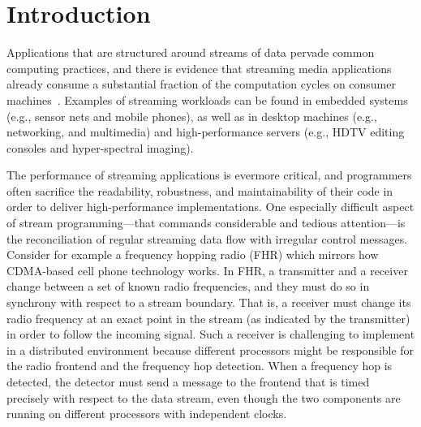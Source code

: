 \section{Introduction}


Applications that are structured around streams of data pervade common
computing  practices,  and  there  is evidence  that  streaming  media
applications already consume a substantial fraction of the computation
cycles    on    consumer   machines~\cite{Rix98}.
Examples  of streaming  workloads  can be  found  in embedded  systems
(e.g., sensor nets and mobile  phones), as well as in desktop machines
(e.g., networking, and  multimedia) and high-performance servers (e.g.,
HDTV editing consoles and hyper-spectral imaging). 

The performance of streaming applications is evermore critical, and
programmers often sacrifice the readability, robustness, and
maintainability of their code in order to deliver high-performance
implementations.  One especially difficult aspect of stream
programming---that commands considerable and tedious attention---is
the reconciliation of regular streaming data flow with irregular
control messages. Consider for example a frequency hopping radio (FHR)
which mirrors how CDMA-based cell phone technology works.  In FHR, a
transmitter and a receiver change between a set of known radio
frequencies, and they must do so in synchrony with respect to a stream
boundary. That is, a receiver must change its radio frequency at an
exact point in the stream (as indicated by the transmitter) in order
to follow the incoming signal.  Such a receiver is challenging to
implement in a distributed environment because different processors
might be responsible for the radio frontend and the frequency hop
detection.  When a frequency hop is detected, the detector must send a
message to the frontend that is timed precisely with respect to the
data stream, even though the two components are running on different
processors with independent clocks.


